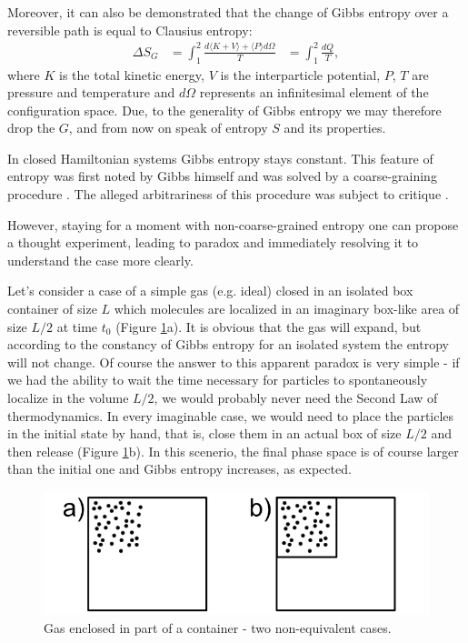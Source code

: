 \documentclass[a4paper,12pt]{article}
\begin{document}
Moreover, it can also be demonstrated \cite{Jaynes:1965gg} that the change of Gibbs entropy over a reversible path is equal to Clausius entropy:
\begin{equation}
\begin{aligned}
  \Delta S_G &= \int_1^2 \frac{d\langle K+ V \rangle+ \langle P \rangle d\Omega}{T}
  &= \int_1^2 \frac{dQ}{T},
\end{aligned}
\end{equation}
where $K$ is the total kinetic energy, $V$ is the interparticle potential, $P$, $T$ are pressure and temperature and $d\Omega$ represents an infinitesimal element of the configuration space.
Due, to the generality of Gibbs entropy we may therefore drop the $G$, and from now on speak of entropy $S$ and its properties.

In closed Hamiltonian systems Gibbs entropy stays constant.
This feature of entropy was first noted by Gibbs himself and was solved by a coarse-graining procedure \cite{Gibbs:1928tw}. The alleged arbitrariness of this procedure was subject to critique \cite{Evans:2241458}. %

However, staying for a moment with non-coarse-grained entropy one can propose a thought experiment, leading to paradox and immediately resolving it to understand the case more clearly. 

Let's consider a case of a simple gas (e.g. ideal) closed in an isolated box container of size $L$ which molecules are localized in an imaginary box-like area of size $L/2$ at time $t_0$ (Figure \ref{Fig1}a).
It is obvious that the gas will expand, but according to the constancy of Gibbs entropy for an isolated system the entropy will not change. Of course the answer to this apparent paradox is very simple - if we had the ability to wait the time necessary for particles to spontaneously localize in the volume $L/2$, we would probably never need the Second Law of thermodynamics. In every imaginable case, we  would need to place the particles in the initial state by hand, that is, close them in an actual box of size $L/2$ and then release (Figure \ref{Fig1}b). 
In this scenerio, the final phase space is of course larger than the initial one and Gibbs entropy increases, as expected.

\begin{figure}[ht!]
\centering \includegraphics[width=12cm]{Figure1} \caption{Gas enclosed in part of a container - two non-equivalent cases.}
\label{Fig1} 
\end{figure}
\end{document}
